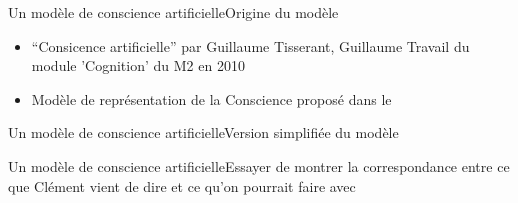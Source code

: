 \begin{frame}{Un modèle de conscience artificielle}{Origine du modèle}
\begin{itemize}
  \item ``Consicence
  artificielle'' par Guillaume Tisserant, Guillaume Travail du module
  'Cognition' du M2 en 2010 
  \item Modèle de représentation de la Conscience proposé dans le  
\end{itemize}
\end{frame}

\begin{frame}{Un modèle de conscience artificielle}{Version simplifiée du
modèle}

\end{frame}

\begin{frame}{Un modèle de conscience artificielle}{Essayer de montrer la correspondance entre ce que Clément vient de dire et ce qu'on pourrait faire avec}

\end{frame}